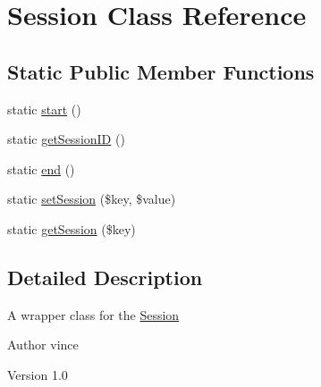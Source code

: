 \hypertarget{class_anemo_1_1_session}{
\section{Session Class Reference}
\label{class_anemo_1_1_session}
}
\subsection*{Static Public Member Functions}
\begin{DoxyCompactItemize}
\item 
static \hyperlink{class_anemo_1_1_session_a146085d0f3a9d17bdcd7f3d4081d8c0d}{start} ()
\item 
static \hyperlink{class_anemo_1_1_session_a8817daff1bf67fb2e35f837e11c7d6b1}{getSessionID} ()
\item 
static \hyperlink{class_anemo_1_1_session_a8f63e369ed0239791deb3928d851d0d5}{end} ()
\item 
static \hyperlink{class_anemo_1_1_session_ae055455aab2c1d7898f48613e8c2202c}{setSession} (\$key, \$value)
\item 
static \hyperlink{class_anemo_1_1_session_a243bb75379130bbee0120bcedfedfe71}{getSession} (\$key)
\end{DoxyCompactItemize}


\subsection{Detailed Description}
A wrapper class for the \hyperlink{class_anemo_1_1_session}{Session} \begin{DoxyAuthor}{Author}
vince 
\end{DoxyAuthor}
\begin{DoxyVersion}{Version}
1.0 
\end{DoxyVersion}



